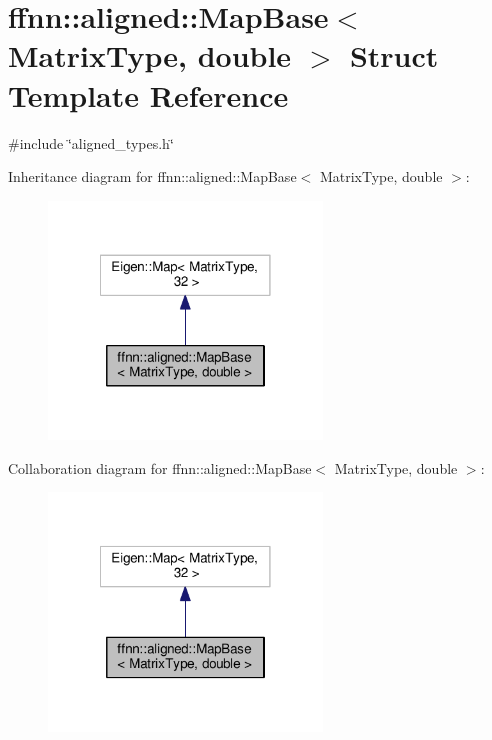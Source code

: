 \hypertarget{structffnn_1_1aligned_1_1_map_base_3_01_matrix_type_00_01double_01_4}{\section{ffnn\-:\-:aligned\-:\-:Map\-Base$<$ Matrix\-Type, double $>$ Struct Template Reference}
\label{structffnn_1_1aligned_1_1_map_base_3_01_matrix_type_00_01double_01_4}
}


{\ttfamily \#include \char`\"{}aligned\-\_\-types.\-h\char`\"{}}



Inheritance diagram for ffnn\-:\-:aligned\-:\-:Map\-Base$<$ Matrix\-Type, double $>$\-:
\nopagebreak
\begin{figure}[H]
\begin{center}
\leavevmode
\includegraphics[width=206pt]{structffnn_1_1aligned_1_1_map_base_3_01_matrix_type_00_01double_01_4__inherit__graph}
\end{center}
\end{figure}


Collaboration diagram for ffnn\-:\-:aligned\-:\-:Map\-Base$<$ Matrix\-Type, double $>$\-:
\nopagebreak
\begin{figure}[H]
\begin{center}
\leavevmode
\includegraphics[width=206pt]{structffnn_1_1aligned_1_1_map_base_3_01_matrix_type_00_01double_01_4__coll__graph}
\end{center}
\end{figure}
